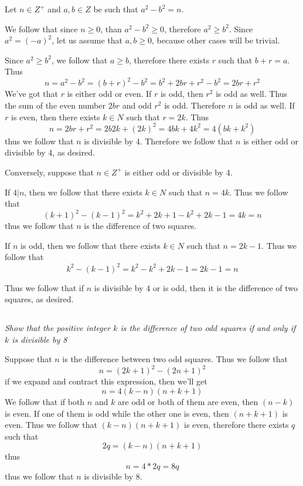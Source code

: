 \documentclass[11pt,oneside,titlepage]{book}
\begin{document}
Let $n \in Z^+$ and  $a, b \in Z$ be such that $a^2 - b^2 = n$.

We follow that since $n \geq 0$, than $a^2 - b^2 \geq 0$, therefore $a^2 \geq b^2$.
Since $a^2 = (-a)^2$, let us assume that $a, b \geq 0$, because other cases will be trivial.

Since $a^2 \geq b^2$, we follow that $a \geq b$, therefore there exists $r$ such that
$b + r = a$. Thus
$$n = a^2 - b^2 = (b + r)^2 - b^2 = b^2 + 2br + r^2 - b^2 = 2br + r^2$$
We've got that $r$ is either odd or even. If $r$ is odd, then $r^2$ is odd as well. Thus
the sum of the even number $2br$ and odd $r^2$ is odd. Therefore $n$ is odd as well.
If $r$ is even, then there exists $k \in N$ such that $r = 2k$. Thus
$$n = 2br + r^2 = 2b2k + (2k)^2 = 4bk + 4k^2 = 4(bk + k^2)$$
thus we follow that $n$ is divisible by 4. Therefore we follow that $n$ is either
odd or divisible by 4, as desired.

Conversely, suppose that $n \in Z^+$ is either odd or divisible by 4.

If $4|n$, then we follow that there exists $k \in N$ such that $n = 4k$. Thus
we follow that
$$(k + 1)^2 - (k - 1)^2 = k^2 + 2k + 1 - k^2 + 2k - 1 = 4k = n$$
thus we follow that $n$ is the difference of two squares.

If $n$ is odd, then we follow that there exists $k \in N$  such that $n = 2k - 1$. Thus
we follow that
$$k^2 - (k - 1)^2 = k^2 - k^2 + 2k - 1 = 2k - 1 = n$$

Thus we follow that if $n$ is divisible by 4 or is odd, then it is the difference of two squares,
as desired.

\subsection{}

\textit{Show that the positive integer $k$ is the difference of two odd squares if and
  only if $k$ is divisible by 8}

Suppose that $n$ is the difference between two odd squares. Thus we follow that
$$n = (2k + 1)^2 - (2n + 1)^2$$
if we expand and contract this expression, then we'll get
$$n = 4(k - n)(n + k + 1)$$
We follow that if both $n$ and $k$ are odd or both of them are even, then $(n - k)$ is even.
If one of them is odd while the other one is even, then $(n + k + 1)$ is even. Thus we
follow that $(k - n)(n + k + 1)$ is even, therefore there exists $q$ such that
$$2q = (k - n)(n + k + 1)$$
thus
$$n = 4 * 2q = 8q$$
thus we follow that $n$ is divisible by 8.
\end{document}
